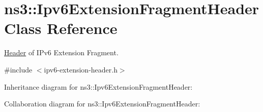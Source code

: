 \hypertarget{classns3_1_1Ipv6ExtensionFragmentHeader}{}\section{ns3\+:\+:Ipv6\+Extension\+Fragment\+Header Class Reference}
\label{classns3_1_1Ipv6ExtensionFragmentHeader}


\hyperlink{classns3_1_1Header}{Header} of I\+Pv6 Extension Fragment.  




{\ttfamily \#include $<$ipv6-\/extension-\/header.\+h$>$}



Inheritance diagram for ns3\+:\+:Ipv6\+Extension\+Fragment\+Header\+:


Collaboration diagram for ns3\+:\+:Ipv6\+Extension\+Fragment\+Header\+:

